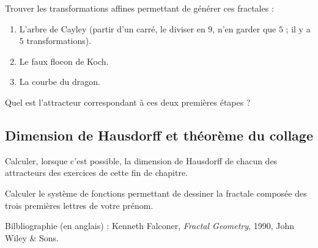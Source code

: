 \documentclass[11pt,class=report,crop=false]{standalone}
\begin{document}
\begin{exercicecours}
Trouver les transformations affines permettant de générer ces fractales :
\begin{enumerate}
 \item L'arbre de Cayley (partir d'un carré, le diviser en $9$, n'en garder que $5$ ; il y a $5$ transformations).
 \item Le faux flocon de Koch.
 \item La courbe du dragon.
\end{enumerate}

\begin{center}
\end{center}

\begin{center}
\end{center}

\begin{center}
\end{center}
\end{exercicecours}


\begin{exercicecours}[\'Enigme]
Quel est l'attracteur correspondant à ces deux premières étapes ?
\begin{center}
\end{center}

\end{exercicecours}



\subsection{Dimension de Hausdorff et théorème du collage}

\begin{exercicecours}
Calculer, lorsque c'est possible, la dimension de Hausdorff de chacun des attracteurs
des exercices de cette fin de chapitre.
\end{exercicecours}


\begin{exercicecours}[\`A l'infini]
Calculer le système de fonctions permettant de dessiner la fractale composée des trois premières lettres
de votre prénom.
\end{exercicecours}


\bigskip
\bigskip

Bilbliographie (en anglais) : Kenneth Falconer, \emph{Fractal Geometry}, 1990, John Wiley \& Sons.


\finchapitre
\end{document}
